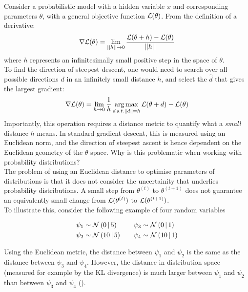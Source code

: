 Consider a probabilistic model with a hidden variable $x$ and corresponding parameters $\theta$, with a general objective function $\mathcal{L}(\theta)$. From the definition of a derivative:
\[
	\nabla \mathcal{L}(\theta) = \lim_{||h||\to0} \frac{\mathcal{L}(\theta + h) - \mathcal{L}(\theta)}{||h||}
\]
where $h$ represents an infinitesimally small positive step in the space of $\theta$.\\
To find the direction of steepest descent, one would need to search over all possible directions $d$ in an infinitely small distance $h$, and select the $\hat{d}$ that gives the largest gradient:
\[
\nabla \mathcal{L}(\theta) = \lim_{h\to0} \frac{1}{h}\operatorname*{arg\,max}_{d \, s.t. \|d\|=h} \mathcal{L}(\theta+d) - \mathcal{L}(\theta)
\]
Importantly, this operation requires a distance metric to quantify what a \textit{small} distance $h$ means. In standard gradient descent, this is measured using an Euclidean norm, and the direction of steepest ascent is hence dependent on the Euclidean geometry of the $\theta$ space. Why is this problematic when working with probability distributions?\\
The problem of using an Euclidean distance to optimise parameters of distributions is that it does not consider the uncertainity that underlies probability distributions. A small step from $\theta^{(t)}$ to $\theta^{(t+1)}$ does not guarantee an equivalently small change from $\mathcal{L}(\theta^{(t)})$ to $\mathcal{L}(\theta^{(t+1)})$.\\
To illustrate this, consider the following example of four random variables

\begin{equation}
	\begin{split}
		\psi_1 &\sim \mathcal{N}\left(0 \,|\, 5\right) \\
		\psi_2 &\sim \mathcal{N}\left(10 \,|\, 5\right)
	\end{split}
	\qquad
	\begin{split}
		\psi_3 &\sim \mathcal{N}\left(0 \,|\, 1\right) \\
		\psi_4 &\sim \mathcal{N}\left(10 \,|\, 1\right)
	\end{split}
\end{equation}

Using the Euclidean metric, the distance between $\psi_1$ and $\psi_2$ is the same as the distance between $\psi_3$ and $\psi_4$. However, the distance in distribution space (measured for example by the KL divergence) is much larger between $\psi_1$ and $\psi_2$ than between $\psi_3$ and $\psi_4$ ().


